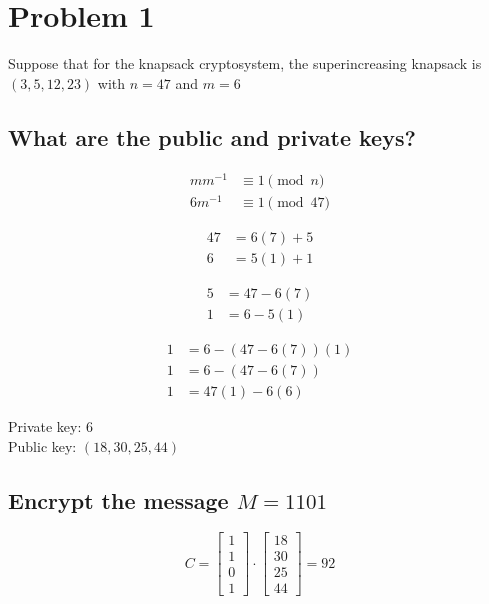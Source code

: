 \documentclass{article}
\newenvironment{problem}[1]{
  \nobreak\section*{Problem #1}
}{}
\begin{document}
  \begin{problem}{1}
    Suppose that for the knapsack cryptosystem, the superincreasing 
    knapsack is $(3, 5, 12, 23)$ with $n=47$ and $m=6$
    
    \subsection*{What are the public and private keys?}
    \begin{center}
      \begin{equation*}
        \begin{split}
          mm^{-1} & \equiv 1 \pmod{n}\\
          6m^{-1} & \equiv 1 \pmod{47}
        \end{split}
      \end{equation*}

      \begin{equation*}
        \begin{split}
          47 & = 6(7) + 5\\
          6 & = 5(1) + 1
        \end{split}
      \end{equation*}

      \begin{equation*}
        \begin{split}
          5 & = 47 - 6(7)\\
          1 & = 6 - 5(1)
        \end{split}
      \end{equation*}

      \begin{equation*}
        \begin{split}
          1 & = 6 - (47 - 6(7))(1)\\
          1 & = 6 - (47 - 6(7))\\
          1 & = 47(1) - 6(6)
        \end{split}
      \end{equation*}
    \end{center}
    Private key: $6$\\
    Public key: $(18, 30, 25, 44)$

    \subsection*{Encrypt the message $M = 1101$}
    \begin{center}
      \begin{equation*}
        C = \begin{bmatrix}1\\1\\0\\1\end{bmatrix}\cdot\begin{bmatrix}18\\30\\25\\44\end{bmatrix}=92
      \end{equation*}
    \end{center}
  \end{problem}
\end{document}
